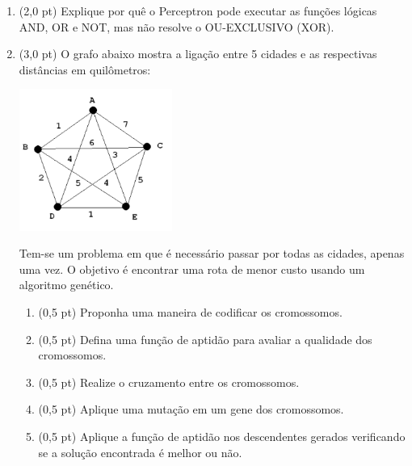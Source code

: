 \documentclass[12pt,a4paper,oneside]{article}
\begin{document}
\begin{enumerate}
	\item (2,0 pt)  Explique por quê o Perceptron pode executar as funções lógicas AND, OR e NOT, mas não resolve o OU-EXCLUSIVO (XOR).
	
	\item (3,0 pt) O grafo abaixo mostra a ligação entre 5 cidades e as respectivas distâncias em quilômetros:
	
	\begin{center}
		\includegraphics[width=5cm]{images/fig02.png}
	\end{center}
	
	Tem-se um problema em que é necessário passar por todas as cidades, apenas uma vez. O objetivo é encontrar uma rota de menor custo usando um algoritmo genético.
	
	\begin{enumerate}
		\item (0,5 pt) Proponha uma maneira de codificar os cromossomos.
		\item (0,5 pt) Defina uma função de aptidão para avaliar a qualidade dos cromossomos.
		\item (0,5 pt) Realize o cruzamento entre os cromossomos.
		\item (0,5 pt) Aplique uma mutação em um gene dos cromossomos.
		\item (0,5 pt) Aplique a função de aptidão nos descendentes gerados verificando se a solução encontrada é melhor ou não.
	\end{enumerate}
\end{enumerate}
\end{document}

